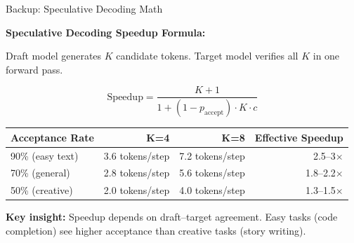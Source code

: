 \documentclass[aspectratio=169, 12pt]{beamer}
\begin{document}
\begin{frame}{Backup: Speculative Decoding Math}
\note{
}

\footnotesize
\textbf{Speculative Decoding Speedup Formula:}

\vspace{0.1cm}
Draft model generates $K$ candidate tokens. Target model verifies all $K$ in one forward pass.

\vspace{0.1cm}
{\small
$$\text{Speedup} = \frac{K + 1}{1 + (1 - p_{\text{accept}}) \cdot K \cdot c}$$
}

\vspace{0.05cm}
\renewcommand{\arraystretch}{1.1}
\begin{tabular}{@{}lrrr@{}}
  \toprule
  \textbf{Acceptance Rate} & \textbf{K=4} & \textbf{K=8} & \textbf{Effective Speedup} \\
  \midrule
  90\% (easy text) & 3.6 tokens/step & 7.2 tokens/step & 2.5--3$\times$ \\
  70\% (general)    & 2.8 tokens/step & 5.6 tokens/step & 1.8--2.2$\times$ \\
  50\% (creative)   & 2.0 tokens/step & 4.0 tokens/step & 1.3--1.5$\times$ \\
  \bottomrule
\end{tabular}

\vspace{0.1cm}
{\footnotesize\textbf{Key insight:} Speedup depends on draft--target agreement. Easy tasks (code completion) see higher acceptance than creative tasks (story writing).}

\end{frame}
\end{document}
